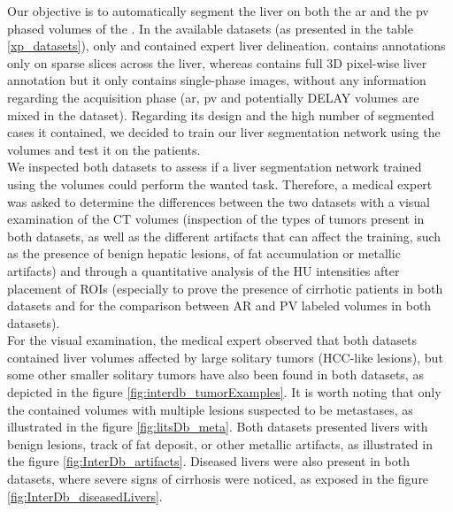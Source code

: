 Our objective is to automatically segment the liver on both the \ac{ar} and the \ac{pv} phased volumes of the \textbf{}. In the available datasets (as presented in the table \ref{xp_datasets}), only \textbf{} and \textbf{} contained expert liver delineation. \textbf{} contains annotations only on sparse slices across the liver, whereas \textbf{} contains full 3D pixel-wise liver annotation but it only contains single-phase images, without any information regarding the
acquisition phase (\ac{ar}, \ac{pv} and potentially DELAY volumes are mixed in the dataset).
Regarding its design and the high number of segmented cases it contained, we decided to train our liver segmentation network using the \textbf{} volumes and test it on the \textbf{} patients.\\
We inspected both datasets to assess if a liver segmentation network trained using the \textbf{} volumes could perform the wanted task. Therefore, a medical expert was asked to determine the differences between the two datasets with a visual examination of the CT volumes (inspection of the types of tumors present in both datasets, as well as the different artifacts that can affect the training, such as the presence of benign hepatic lesions, of fat accumulation or metallic artifacts) and through a quantitative analysis of the HU intensities after placement of ROIs (especially to prove the presence of cirrhotic patients in both datasets and for the comparison between AR and PV labeled volumes in both datasets). \\
For the visual examination, the medical expert observed that both datasets contained liver volumes affected by large solitary tumors (HCC-like lesions), but some other smaller solitary tumors have also been found in both datasets, as depicted in the figure \ref{fig:interdb_tumorExamples}. It is worth noting that only the \textbf{} contained volumes with multiple lesions suspected to be metastases, as illustrated in the figure \ref{fig:litsDb_meta}. Both datasets presented livers with benign lesions, track of fat deposit, or other metallic artifacts, as illustrated in the figure \ref{fig:InterDb_artifacts}. Diseased livers were also present in both datasets, where severe signs of cirrhosis were noticed, as exposed in the figure \ref{fig:InterDb_diseasedLivers}.

